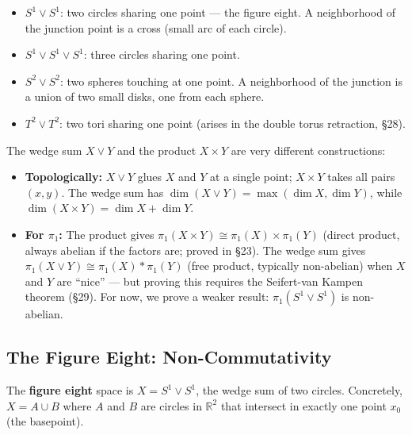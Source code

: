 \documentclass[11pt]{report}
\begin{document}
\begin{exbox}
\begin{itemize}[nosep]
    \item $S^1 \vee S^1$: two circles sharing one point --- the figure eight. A neighborhood of the junction point is a cross (small arc of each circle).
    \item $S^1 \vee S^1 \vee S^1$: three circles sharing one point.
    \item $S^2 \vee S^2$: two spheres touching at one point. A neighborhood of the junction is a union of two small disks, one from each sphere.
    \item $T^2 \vee T^2$: two tori sharing one point (arises in the double torus retraction, \S 28).
\end{itemize}
\end{exbox}

\begin{rembox}
The wedge sum $X \vee Y$ and the product $X \times Y$ are very different constructions:
\begin{itemize}[nosep]
    \item \textbf{Topologically:} $X \vee Y$ glues $X$ and $Y$ at a single point; $X \times Y$ takes all pairs $(x, y)$. The wedge sum has $\dim(X \vee Y) = \max(\dim X, \dim Y)$, while $\dim(X \times Y) = \dim X + \dim Y$.
    \item \textbf{For $\pi_1$:} The product gives $\pi_1(X \times Y) \cong \pi_1(X) \times \pi_1(Y)$ (direct product, always abelian if the factors are; proved in \S 23). The wedge sum gives $\pi_1(X \vee Y) \cong \pi_1(X) * \pi_1(Y)$ (free product, typically non-abelian) when $X$ and $Y$ are ``nice'' --- but proving this requires the Seifert-van Kampen theorem (\S 29). For now, we prove a weaker result: $\pi_1(S^1 \vee S^1)$ is non-abelian.
\end{itemize}
\end{rembox}

\subsection{The Figure Eight: Non-Commutativity}

\begin{defbox}
The \textbf{figure eight} space is $X = S^1 \vee S^1$, the wedge sum of two circles. Concretely, $X = A \cup B$ where $A$ and $B$ are circles in $\mathbb{R}^2$ that intersect in exactly one point $x_0$ (the basepoint).
\end{defbox}
\end{document}
